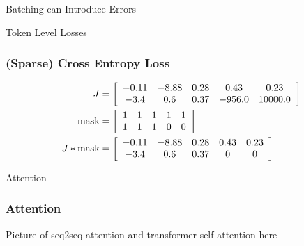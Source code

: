 \documentclass{beamer}
\begin{document}
\begin{section}{Batching can Introduce Errors}
\begin{subsection}{Token Level Losses}
        \begin{frame}
            \frametitle{(Sparse) Cross Entropy Loss}
            \begin{align*}
                J &= \left[ \begin{array}{*5{c}}
                    -0.11 & -8.88 & 0.28 & 0.43 & 0.23 \\
                    -3.4 & 0.6 & 0.37 & -956.0 & 10000.0
                \end{array} \right]\\
                \text{mask} &= \left[ \begin{array}{*5{c}}
                    1 & 1 & 1 & 1 & 1 \\
                    1 & 1 & 1 & 0 & 0
                \end{array} \right] \\
                J * \text{mask} &= \left[ \begin{array}{*5{c}}
                    -0.11 & -8.88 & 0.28 & 0.43 & 0.23 \\
                    -3.4 & 0.6 & 0.37 & 0 & 0
                \end{array} \right]\\
            \end{align*}
        \end{frame}

    \end{subsection} %

    \begin{subsection}{Attention}

        \begin{frame}
            \frametitle{Attention}

            Picture of seq2seq attention and transformer self attention here


\end{frame}
\end{subsection}
\end{section}
\end{document}
